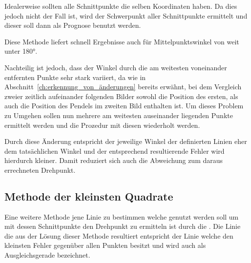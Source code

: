 
Idealerweise sollten alle Schnittpunkte die selben Koordinaten haben.
Da dies jedoch nicht der Fall ist, wird der Schwerpunkt aller Schnittpunkte ermittelt und dieser soll dann als Prognose benutzt werden.

Diese Methode liefert schnell Ergebnisse auch für Mittelpunktswinkel von weit unter 180°.


Nachteilig ist jedoch, dass der Winkel durch die am weitesten voneinander entfernten Punkte sehr stark variiert, da wie in Abschnitt~\ref{ch:erkennung_von_änderungen} bereits erwähnt, bei dem Vergleich zweier zeitlich aufeinander folgenden Bilder sowohl die Position des ersten, als auch die Position des Pendels im zweiten Bild enthalten ist.
Um dieses Problem zu Umgehen sollen nun mehrere am weitesten auseinander liegenden Punkte ermittelt werden und die Prozedur mit diesen wiederholt werden.

Durch diese Änderung entspricht der jeweilige Winkel der definierten Linien eher dem tatsächlichen Winkel und der entsprechend resultierende Fehler wird hierdurch kleiner.
Damit reduziert sich auch die Abweichung zum daraus errechneten Drehpunkt.

\subsection{Methode der kleinsten Quadrate}

Eine weitere Methode jene Linie zu bestimmen welche genutzt werden soll um mit dessen Schnittpunkte den Drehpunkt zu ermitteln ist durch die .
Die Linie die aus der Lösung dieser Methode resultiert entspricht der Linie welche den kleinsten Fehler gegenüber allen Punkten besitzt und wird auch als Ausgleichsgerade bezeichnet. %



